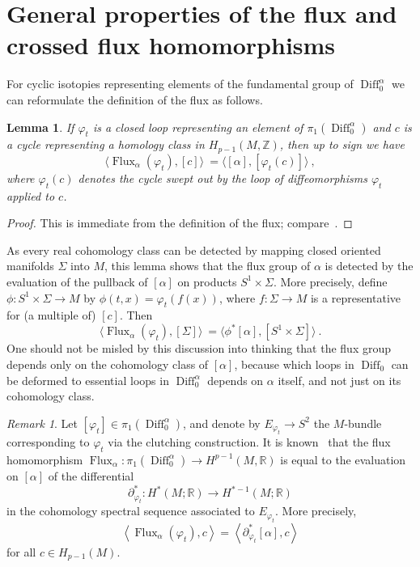 \documentclass[12pt]{amsart}
\newtheorem{lemma}[theorem]{Lemma}
\theoremstyle{definition}
\theoremstyle{remark}
\newtheorem{remark}[theorem]{Remark}
\def\bZ{{\mathbb Z}}
\def\bR{{\mathbb R}}
\newcommand\Flux{\operatorname{Flux}}
\newcommand\Diff{\operatorname{Diff}}
\begin{document}
\section{General properties of the flux and crossed flux homomorphisms}\label{s:general}

For cyclic isotopies representing elements of the fundamental group of 
$\Diff^{\alpha}_{0}$ we can reformulate the definition of the flux as follows.
\begin{lemma}\label{l:tori}
If $\varphi_{t}$ is a closed loop representing an element of 
$\pi_{1}(\Diff^{\alpha}_{0})$ and $c$ is a cycle representing a 
homology class in $H_{p-1}(M,\bZ)$, then up to sign we have
$$
\langle \Flux_{\alpha}(\varphi_{t}),[c]\rangle \ = \langle 
[\alpha],[\varphi_{t}(c)]\rangle \ ,
$$
where $\varphi_{t}(c)$ denotes the cycle swept out by the loop of 
diffeomorphisms $\varphi_{t}$ applied to $c$.
\end{lemma}
\begin{proof}
    This is immediate from the definition of the flux; compare~\cite{McDuff}.
    \end{proof}
As every real cohomology class can be detected by mapping closed 
oriented manifolds $\Sigma$ into $M$, this lemma shows that the flux 
group of $\alpha$ is detected by the evaluation of the pullback of 
$[\alpha]$ on products $S^{1}\times\Sigma$. More precisely, define 
$\phi\colon S^{1}\times\Sigma\rightarrow M$ by 
$\phi(t,x)=\varphi_{t}(f(x))$, where $f\colon\Sigma\rightarrow M$ 
is a representative for (a multiple of) $[c]$. Then 
$$
\langle \Flux_{\alpha}(\varphi_{t}),[\Sigma]\rangle \ = \langle 
\phi^{*}[\alpha],[S^{1}\times\Sigma]\rangle \ .
$$
One should not be misled by this discussion into thinking that the 
flux group depends only on the cohomology class of $[\alpha]$, 
because which loops in $\Diff_{0}$ can be deformed to essential loops 
in $\Diff^{\alpha}_{0}$ depends on $\alpha$ itself, and not just on 
its cohomology class.

\begin{remark}\label{r:ss}
Let $[\varphi_{t}]\in\pi_1(\Diff^{\alpha}_{0})$, and denote by 
$E_{\varphi_{t}}\to S^2$ the $M$-bundle corresponding
to $\varphi_{t}$ via the clutching construction.
It is known~\cite{LO,Oprea} that the flux homomorphism 
$\Flux_{\alpha}\colon\pi_1(\Diff^{\alpha}_{0})\to H^{p-1}(M,\bR)$
is equal to the evaluation on $[\alpha]$ of the differential 
$$
\partial_{\varphi_{t}}^*\colon H^{*}(M;\bR)\longrightarrow H^{*-1}(M;\bR)
$$
in the cohomology spectral sequence associated to $E_{\varphi_{t}}$. 
More precisely,
$$
\left <\Flux_{\alpha}(\varphi_{t}),c\right > = 
\left <\partial_{\varphi_{t}}^*[\alpha], c \right >
$$
for all $c\in H_{p-1}(M)$.
\end{remark}
\end{document}
